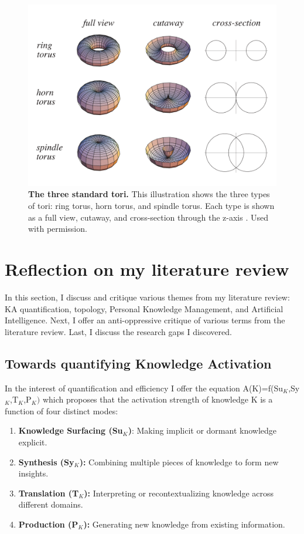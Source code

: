 \begin{figure}[h]
    \centering
    \includegraphics[width=0.5\linewidth]{figures/f21.png}
    \caption[The three standard tori]{\textbf{The three standard tori.} This illustration shows the three types of tori: ring torus, horn torus, and spindle torus. Each type is shown as a full view, cutaway, and cross-section through the z-axis \citep{weisstein_torus_nodate}. Used with permission.}
    \label{fig:21}
\end{figure}

\FloatBarrier



\section{Reflection on my literature review}
In this section, I discuss and critique various themes from my literature review: KA quantification, topology, Personal Knowledge Management, and Artificial Intelligence. Next, I offer an anti-oppressive critique of various terms from the literature review. Last, I discuss the research gaps I discovered. 

\subsection{Towards quantifying Knowledge Activation}
In the interest of quantification and efficiency I offer the equation A(K)=f(Su$_K$,Sy$_K$,T$_K$,P$_K)$ which proposes that the activation strength of knowledge K is a function of four distinct modes:
\begin{enumerate}
    \item \textbf{Knowledge Surfacing (Su$_K$)}: Making implicit or dormant knowledge explicit.
\item \textbf{Synthesis (Sy$_K$):} Combining multiple pieces of knowledge to form new insights.
\item \textbf{Translation (T$_K$):} Interpreting or recontextualizing knowledge across different domains.
\item \textbf{Production (P$_K$):} Generating new knowledge from existing information.
\end{enumerate}

